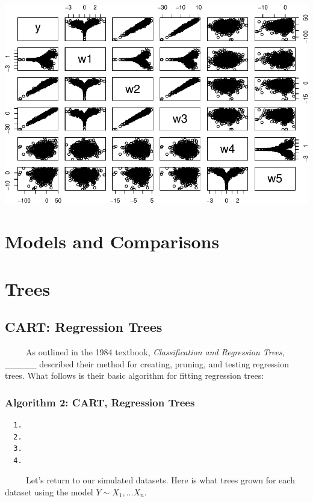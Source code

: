 \documentclass[12pt,twoside]{reedthesis}
\begin{document}
  \begin{center}\includegraphics{Thesis_files/figure-latex/logAbs-1} \end{center}
  
  \section{Models and Comparisons}\label{models-and-comparisons}
  
  \section{Trees}\label{trees-1}
  
  \subsection{CART: Regression Trees}\label{cart-regression-trees}
  
  ~~~~~As outlined in the 1984 textbook, \emph{Classification and
  Regression Trees}, \_\_\_\_\_ described their method for creating,
  pruning, and testing regression trees. What follows is their basic
  algorithm for fitting regression trees:
  
  \subsubsection{Algorithm 2: CART, Regression
  Trees}\label{algorithm-2-cart-regression-trees}
  
  \begin{verbatim}
  1.
  2.
  3.
  4.
  \end{verbatim}
  
  ~~~~~Let's return to our simulated datasets. Here is what trees grown
  for each dataset using the model \(Y\sim X_1,...X_n\).
  
\end{document}
